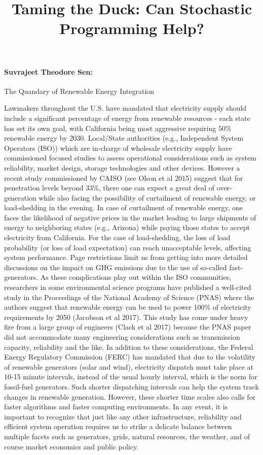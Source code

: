 \documentclass[11pt,a4paper]{article}
\title{\bf Taming the Duck: Can Stochastic Programming Help?}
\date{}
\begin{document}
\maketitle

\vspace*{-1.3cm}

\paragraph{Suvrajeet Theodore Sen:} 
The Quandary of Renewable Energy Integration

Lawmakers throughout the U.S. have mandated that electricity supply should include a significant percentage of energy from renewable resources - each state has set its own goal, with California being most aggressive requiring 50\% renewable energy by 2030.  Local/State authorities (e.g., Independent System Operators (ISO)) which are in-charge of wholesale electricity supply have commissioned focused studies to assess operational considerations such as system reliability, market design, storage technologies and other devices.  However a recent study commissioned by CAISO (see Olson et al 2015) suggest that for penetration levels beyond 33\%, there one can expect a great deal of over-generation  while also facing the possibility of curtailment of renewable energy, or load-shedding in the evening.  In case of curtailment of renewable energy, one faces the likelihood of negative prices in the market leading to large shipments of energy to neighboring states (e.g., Arizona) while paying those states to accept electricity from California. For the case of load-shedding, the loss of load probability (or loss of load expectation) can reach unacceptable levels, affecting system performance.  Page restrictions limit us from getting into more detailed discussions on the impact on GHG emissions due to the use of so-called fast-generators.  As these complications play out within the ISO communities, researchers in some environmental science programs have published a well-cited study in the Proceedings of the National Academy of Science (PNAS) where the authors suggest that renewable energy can be used to power 100\% of electricity requirements by 2050  (Jacobson et al 2017).  This study has come under heavy fire from a large group of engineers (Clack et al 2017) because the PNAS paper did not accommodate many engineering considerations such as transmission capacity, reliability and the like.   In addition to these considerations, the Federal Energy Regulatory Commission (FERC) has mandated that due to the volatility of renewable generators (solar and wind), electricity dispatch must take place at 10-15 minute intervals, instead of the usual hourly interval, which is the norm for fossil-fuel generators.  Such shorter dispatching intervals can help the system track changes in renewable generation.  However, these shorter time scales also calls for faster algorithms and faster computing environments.  In any event, it is important to recognize that just like any other infrastructure, reliability and efficient system operation requires us to strike a delicate balance between multiple facets such as generators, grids, natural resources, the weather, and of course market economics and public policy.  
\end{document}
